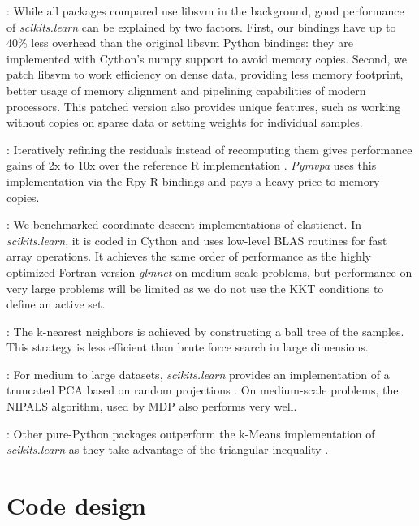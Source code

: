 \documentclass[twoside,11pt]{article}
\begin{document}
\smallskip {}:
%
While all packages compared use libsvm in the background, good
performance of \emph{scikits.learn} can be explained by two factors.
First, our bindings have up to 40\% less overhead than the original
libsvm Python bindings: they are implemented with Cython's numpy support
to avoid memory copies. Second, we patch libsvm to work efficiency
on dense data, providing less memory footprint, better usage of memory
alignment and pipelining capabilities of modern processors. This patched
version also provides unique features, such as working without copies on
sparse data or setting weights for individual samples.


\smallskip {}:
%
Iteratively refining the residuals instead of recomputing them gives
performance gains of 2x to 10x over the reference R implementation
\citep{LARS}. {\sl Pymvpa} uses this implementation via the Rpy R
bindings and pays a heavy price to memory copies.


\smallskip {}:
%
We benchmarked coordinate descent implementations of elasticnet.  In
\emph{scikits.learn}, it is coded in Cython and uses low-level BLAS
routines for fast array operations. It achieves the same order of
performance as the highly optimized Fortran version \emph{glmnet}
\citep{friedman2010} on medium-scale problems, but performance on very
large problems will be limited as we do not use the KKT conditions to
define an active set.

\smallskip
{}:
%
The k-nearest neighbors is achieved by constructing a ball
tree \citep{omohundro1989} of the samples. This strategy is less
efficient than brute force search in large dimensions.

\smallskip
{}:
%
For medium to large datasets, \emph{scikits.learn} provides an
implementation of a truncated PCA based on random projections
\citep{rokhlin2009}. On medium-scale problems, the NIPALS algorithm, used
by MDP also performs very well.

\smallskip
{}:
%
Other pure-Python packages outperform the k-Means implementation of
\emph{scikits.learn} as they take advantage of the triangular inequality
\citep{elkan2003}.

\section{Code design}
\end{document}
